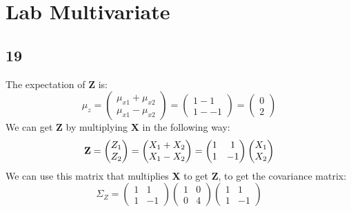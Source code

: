 \documentclass[a4paper,12px]{article}
\begin{document}

\section{Lab Multivariate}
\subsection{19}
The expectation of \textbf{Z} is:
\begin{equation}
    \mu_z=\left( \begin{matrix}\mu_{x1}+\mu_{x2}\\\mu_{x1}-\mu_{x2}\end{matrix} \right)=
    \left(\begin{matrix}1-1\\1--1\end{matrix} \right)=
    \left(\begin{matrix}0\\2\end{matrix} \right)
\end{equation}
We can get \textbf{Z} by multiplying \textbf{X} in the following way:
\begin{equation}
    \text{\textbf{Z}}=\left(\begin{matrix}Z_1\\Z_2\end{matrix}\right)=
    \left(\begin{matrix}X_1+X_2\\X_1-X_2\end{matrix}\right)=
    \left(\begin{matrix}1&1\\1&-1\end{matrix}\right)\left(\begin{matrix}X_1\\X_2\end{matrix}\right)
\end{equation}
We can use this matrix that multiplies \textbf{X} to get \textbf{Z}, to get the
 covariance matrix:
\begin{equation}
    \Sigma_Z=\left(\begin{matrix}1&1\\1&-1\end{matrix}\right)
    \left(\begin{matrix}1&0\\0&4\end{matrix}\right)
    \left(\begin{matrix}1&1\\1&-1\end{matrix}\right)
\end{equation}
\end{document}
